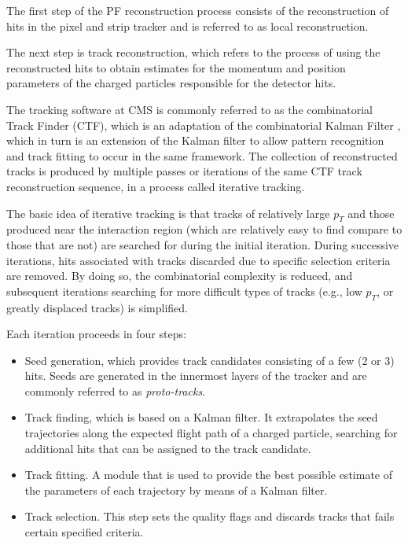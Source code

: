 The first step of the PF reconstruction process consists of the reconstruction of hits in the pixel and strip tracker\cite{TRK-11-001} and is referred to as local reconstruction.

The next step is track reconstruction, which refers to the process of using the reconstructed hits to obtain estimates for the momentum and position parameters of the charged particles responsible for the detector hits. 

The tracking software at CMS\cite{TRK-11-001} is commonly referred to as the combinatorial Track Finder (CTF), which is an adaptation of the combinatorial Kalman Filter \cite{Billoir:1989mh,BILLOIR1990219,Mankel:1997dy}, which in turn is an extension of the Kalman filter\cite{Fruhwirth:1987fm} to allow pattern recognition and track fitting to occur in the same framework. The collection of reconstructed tracks is produced by multiple passes or iterations of the same CTF track reconstruction sequence, in a process called iterative tracking. 

The basic idea of iterative tracking is that tracks of relatively large $p_{T}$ and those produced near the interaction region (which are relatively easy to find compare to those that are not) are searched for during the initial iteration. During successive iterations, hits associated with tracks discarded due to specific selection criteria are removed. By doing so, the combinatorial complexity is reduced, and subsequent iterations searching for more difficult types of tracks (e.g., low $p_{T}$, or greatly displaced tracks) is simplified.

Each iteration proceeds in four steps:

\begin{itemize}
	\item Seed generation, which provides track candidates consisting of a few (2 or 3) hits. Seeds are generated in the innermost layers of the tracker and are commonly referred to as \textit{proto-tracks}.
	\item Track finding, which is based on a Kalman filter. It extrapolates the seed trajectories along the expected flight path of a charged particle, searching for additional hits that can be assigned to the track candidate.
	\item Track fitting. A module that is used to provide the best possible estimate of the parameters of each trajectory by means of a Kalman filter.
	\item Track selection. This step sets the quality flags and discards tracks that fails certain specified criteria.
\end{itemize}

